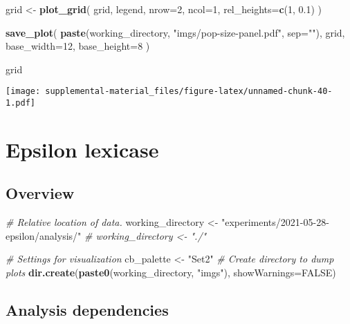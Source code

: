 \documentclass[]{book}
\newenvironment{Shaded}{\begin{snugshade}}{\end{snugshade}}
\newcommand{\CommentTok}[1]{\textcolor[rgb]{0.56,0.35,0.01}{\textit{#1}}}
\newcommand{\DataTypeTok}[1]{\textcolor[rgb]{0.13,0.29,0.53}{#1}}
\newcommand{\DecValTok}[1]{\textcolor[rgb]{0.00,0.00,0.81}{#1}}
\newcommand{\FloatTok}[1]{\textcolor[rgb]{0.00,0.00,0.81}{#1}}
\newcommand{\KeywordTok}[1]{\textcolor[rgb]{0.13,0.29,0.53}{\textbf{#1}}}
\newcommand{\NormalTok}[1]{#1}
\newcommand{\OtherTok}[1]{\textcolor[rgb]{0.56,0.35,0.01}{#1}}
\newcommand{\StringTok}[1]{\textcolor[rgb]{0.31,0.60,0.02}{#1}}
\begin{document}
\begin{Shaded}
\begin{Highlighting}[]
\NormalTok{grid <-}\StringTok{ }\KeywordTok{plot_grid}\NormalTok{(}
\NormalTok{  grid,}
\NormalTok{  legend,}
  \DataTypeTok{nrow=}\DecValTok{2}\NormalTok{,}
  \DataTypeTok{ncol=}\DecValTok{1}\NormalTok{,}
  \DataTypeTok{rel_heights=}\KeywordTok{c}\NormalTok{(}\DecValTok{1}\NormalTok{, }\FloatTok{0.1}\NormalTok{)}
\NormalTok{)}


\KeywordTok{save_plot}\NormalTok{(}
  \KeywordTok{paste}\NormalTok{(working_directory, }\StringTok{"imgs/pop-size-panel.pdf"}\NormalTok{, }\DataTypeTok{sep=}\StringTok{""}\NormalTok{),}
\NormalTok{  grid,}
  \DataTypeTok{base_width=}\DecValTok{12}\NormalTok{,}
  \DataTypeTok{base_height=}\DecValTok{8}
\NormalTok{)}

\NormalTok{grid}
\end{Highlighting}
\end{Shaded}

\texttt{[image: supplemental-material\_files/figure-latex/unnamed-chunk-40-1.pdf]}

\hypertarget{epsilon-lexicase}{%
\chapter{Epsilon lexicase}\label{epsilon-lexicase}}

\hypertarget{overview-3}{%
\section{Overview}\label{overview-3}}

\begin{Shaded}
\begin{Highlighting}[]
\CommentTok{# Relative location of data.}
\NormalTok{working_directory <-}\StringTok{ "experiments/2021-05-28-epsilon/analysis/"}
\CommentTok{# working_directory <- "./"}

\CommentTok{# Settings for visualization}
\NormalTok{cb_palette <-}\StringTok{ "Set2"}
\CommentTok{# Create directory to dump plots}
\KeywordTok{dir.create}\NormalTok{(}\KeywordTok{paste0}\NormalTok{(working_directory, }\StringTok{"imgs"}\NormalTok{), }\DataTypeTok{showWarnings=}\OtherTok{FALSE}\NormalTok{)}
\end{Highlighting}
\end{Shaded}

\hypertarget{analysis-dependencies-3}{%
\section{Analysis dependencies}\label{analysis-dependencies-3}}
\end{document}
